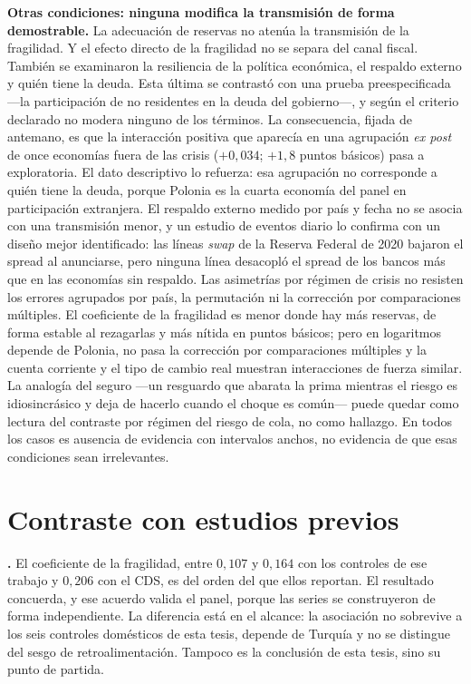 \textbf{Otras condiciones: ninguna modifica la transmisión de forma demostrable.} La adecuación de reservas no atenúa la transmisión de la fragilidad. Y el efecto directo de la fragilidad no se separa del canal fiscal. También se examinaron la resiliencia de la política económica, el respaldo externo y quién tiene la deuda. Esta última se contrastó con una prueba preespecificada ---la participación de no residentes en la deuda del gobierno---, y según el criterio declarado no modera ninguno de los términos. La consecuencia, fijada de antemano, es que la interacción positiva que aparecía en una agrupación \textit{ex post} de once economías fuera de las crisis ($+0{,}034$; $+1{,}8$ puntos básicos) pasa a exploratoria. El dato descriptivo lo refuerza: esa agrupación no corresponde a quién tiene la deuda, porque Polonia es la cuarta economía del panel en participación extranjera. El respaldo externo medido por país y fecha no se asocia con una transmisión menor, y un estudio de eventos diario lo confirma con un diseño mejor identificado: las líneas \textit{swap} de la Reserva Federal de 2020 bajaron el spread al anunciarse, pero ninguna línea desacopló el spread de los bancos más que en las economías sin respaldo. Las asimetrías por régimen de crisis no resisten los errores agrupados por país, la permutación ni la corrección por comparaciones múltiples. El coeficiente de la fragilidad es menor donde hay más reservas, de forma estable al rezagarlas y más nítida en puntos básicos; pero en logaritmos depende de Polonia, no pasa la corrección por comparaciones múltiples y la cuenta corriente y el tipo de cambio real muestran interacciones de fuerza similar. La analogía del seguro ---un resguardo que abarata la prima mientras el riesgo es idiosincrásico y deja de hacerlo cuando el choque es común--- puede quedar como lectura del contraste por régimen del riesgo de cola, no como hallazgo. En todos los casos es ausencia de evidencia con intervalos anchos, no evidencia de que esas condiciones sean irrelevantes.

\section{Contraste con estudios previos}
\label{sec:disc-literatura}

\textbf{\citet{Chari2024b}.} El coeficiente de la fragilidad, entre $0{,}107$ y $0{,}164$ con los controles de ese trabajo y $0{,}206$ con el CDS, es del orden del que ellos reportan. El resultado concuerda, y ese acuerdo valida el panel, porque las series se construyeron de forma independiente. La diferencia está en el alcance: la asociación no sobrevive a los seis controles domésticos de esta tesis, depende de Turquía y no se distingue del sesgo de retroalimentación. Tampoco es la conclusión de esta tesis, sino su punto de partida.

